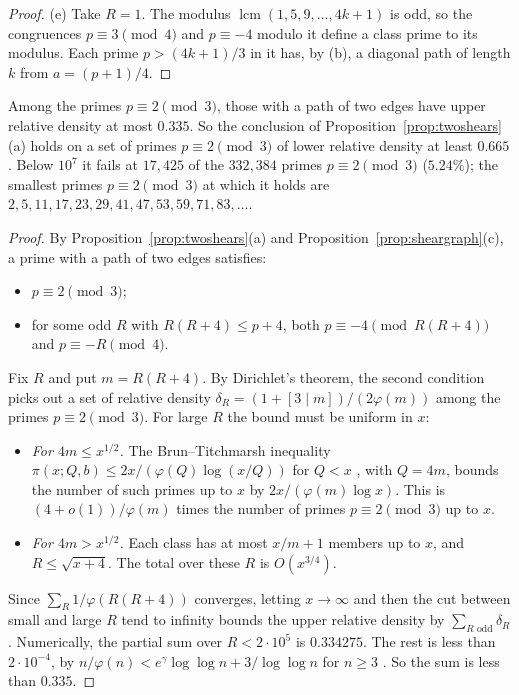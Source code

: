 \begin{proof}
(e) Take $R=1$. The modulus $\operatorname{lcm}(1,5,9,\dots,4k+1)$ is odd, so the congruences $p\equiv3\pmod4$ and $p\equiv-4$ modulo it define a class prime to its modulus. Each prime $p>(4k+1)/3$ in it has, by (b), a diagonal path of length $k$ from $a=(p+1)/4$.
\end{proof}

\begin{remark}\label{rem:sheardensity}
Among the primes $p\equiv2\pmod3$, those with a path of two edges have upper relative density at most $0.335$. So the conclusion of Proposition~\ref{prop:twoshears}(a) holds on a set of primes $p\equiv2\pmod3$ of lower relative density at least $0.665$. Below $10^7$ it fails at $17{,}425$ of the $332{,}384$ primes $p\equiv2\pmod3$ ($5.24\%$); the smallest primes $p\equiv2\pmod3$ at which it holds are $2,5,11,17,23,29,41,47,53,59,71,83,\dots$.
\end{remark}
\begin{proof}
By Proposition~\ref{prop:twoshears}(a) and Proposition~\ref{prop:sheargraph}(c), a prime with a path of two edges satisfies:
\begin{itemize}
\item $p\equiv2\pmod3$;
\item for some odd $R$ with $R(R+4)\le p+4$, both $p\equiv-4\pmod{R(R+4)}$ and $p\equiv-R\pmod4$.
\end{itemize}
Fix $R$ and put $m=R(R+4)$. By Dirichlet's theorem, the second condition picks out a set of relative density $\delta_R=(1+[3\mid m])/(2\varphi(m))$ among the primes $p\equiv2\pmod3$.
For large $R$ the bound must be uniform in $x$:
\begin{itemize}
\item \emph{For $4m\le x^{1/2}$.} The Brun--Titchmarsh inequality $\pi(x;Q,b)\le2x/(\varphi(Q)\log(x/Q))$ for $Q<x$ \cite{MontgomeryVaughan}, with $Q=4m$, bounds the number of such primes up to $x$ by $2x/(\varphi(m)\log x)$. This is $(4+o(1))/\varphi(m)$ times the number of primes $p\equiv2\pmod3$ up to $x$.
\item \emph{For $4m>x^{1/2}$.} Each class has at most $x/m+1$ members up to $x$, and $R\le\sqrt{x+4}$. The total over these $R$ is $O(x^{3/4})$.
\end{itemize}
Since $\sum_R1/\varphi(R(R+4))$ converges, letting $x\to\infty$ and then the cut between small and large $R$ tend to infinity bounds the upper relative density by $\sum_{R\text{ odd}}\delta_R$.
Numerically, the partial sum over $R<2\cdot10^5$ is $0.334275$. The rest is less than $2\cdot10^{-4}$, by $n/\varphi(n)<e^\gamma\log\log n+3/\log\log n$ for $n\ge3$ \cite{RosserSchoenfeld}. So the sum is less than $0.335$.
\end{proof}

